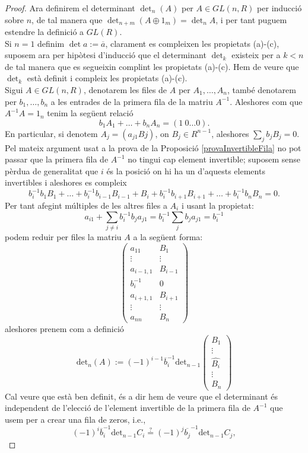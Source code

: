 \begin{proof}
\indent Ara definirem el determinant $\det_n(A)$ per $A\in GL(n,R)$ per inducció sobre $n$, de tal manera que $\det_{n+m}(A\oplus 1_m) = \det_n A$, i per tant puguem estendre la definició a $GL(R)$.\\
Si $n=1$ definim $\det a := \overline{a}$, clarament es compleixen les propietats (a)-(c), suposem ara per hipòtesi d'inducció que el determinant $\det_k$ existeix per a $k<n$ de tal manera que es segueixin complint les propietats (a)-(c). Hem de veure que $\det_k$ està definit i compleix les propietats (a)-(c). \\
Sigui $A\in GL(n,R)$, denotarem les files de $A$ per $A_1 , \dots , A_n$, també denotarem per $b_1 ,\dots , b_n$ a les entrades de la primera fila de la matriu $A^{-1}$. Aleshores com que $A^{-1}A=1_n$ tenim la següent relació 
$$
b_1A_1 + \dots + b_n A_n = (1 \ 0 \dots 0).
$$
En particular, si denotem $A_j=(a_{j1} Bj)$, on $B_j\in R^{n-1}$, aleshores $\sum_{j}b_jB_j=0$. \\
Pel mateix argument usat a la prova de la Proposició \ref{provaInvertibleFila} no pot passar que la primera fila de $A^{-1}$ no tingui cap element invertible; suposem sense pèrdua de generalitat que $i$ és la posició on hi ha un d'aquests elements invertibles i aleshores es compleix
$$
b_i^{-1}b_1B_1+\dots +b_{i}^{-1}b_{i-1}B_{i-1}+B_i+b_{i}^{-1}b_{i+1}B_{i+1}+\dots + b_i^{-1}b_nB_n = 0.
$$
Per tant afegint múltiples de les altres files a $A_i$ i usant la propietat:
$$
a_{i1}+\sum_{j\neq i} b_i^{-1}b_ja_{j1} = b_i^{-1}\sum_j b_ja_{j1}=b_i^{-1}
$$
podem reduir per files la matriu $A$ a la següent forma:
$$
 \left( \begin{matrix}
  a_{11} & B_1  \\
  \vdots & \vdots \\
  a_{i-1,1} & B_{i-1} \\
  b_i^{-1} & 0 \\
  a_{i+1,1} & B_{i+1} \\
  \vdots & \vdots \\
  a_{nn} & B_n
 \end{matrix} \right)
 $$
aleshores prenem com a definició 
\begin{equation} \label{determinantDef}
\text{det}_n(A):=(-1)^{i-1}\overbar{b}^{-1}_i \text{det}_{n-1} \left( \begin{matrix}
  B_1  \\
  \vdots \\
  \hat{B_i} \\
  \vdots \\
  B_n 
 \end{matrix} \right)
 \end{equation}
 Cal veure que està ben definit, és a dir hem de veure que el determinant és independent de l'elecció de l'element invertible de la primera fila de $A^{-1}$ que usem per a crear una fila de zeros, i.e.,
 \begin{equation} \label{determinant}
 (-1)^i \overbar{b}^{-1}_i \text{det}_{n-1} C_i \stackrel{?}{=} (-1)^j \overbar{b_j}^{-1} \text{det}_{n-1}C_j,
 \end{equation}
 

\end{proof}
